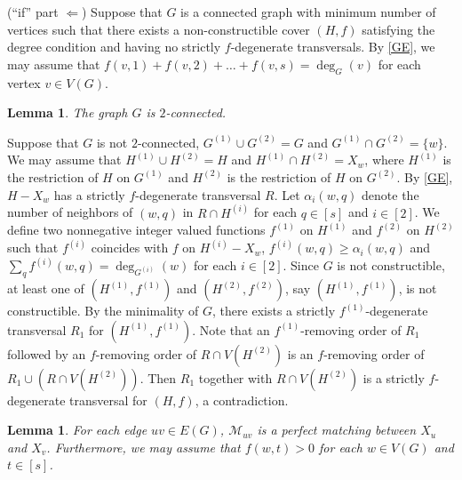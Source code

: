 \documentclass{article}
\makeatletter
\renewenvironment{proof}[1][\proofname]{\par
  \pushQED{\qed}%
  \normalfont \topsep6\p@\@plus6\p@\relax
  \trivlist
  \item[\hskip\labelsep
        \bfseries
    #1\@addpunct{.}]\ignorespaces
}{%
  \popQED\endtrivlist\@endpefalse
}
\newtheorem{lemma}[theorem]{Lemma}
\theoremstyle{definition}
\makeatother
\begin{document}
\begin{proof}[Proof of \autoref{MR}]
(``if'' part $\Longleftarrow$) Suppose that $G$ is a connected graph with minimum number of vertices such that there exists a non-constructible cover $(H, f)$ satisfying the degree condition and having no strictly $f$-degenerate transversals. By \autoref{GE}, we may assume that $f(v, 1) + f(v, 2) + \dots + f(v, s) = \deg_{G}(v)$ for each vertex $v \in V(G)$. 

\begin{lemma}\label{2-con}
The graph $G$ is $2$-connected. 
\end{lemma}
\begin{proof}
Suppose that $G$ is not $2$-connected, $G^{(1)} \cup G^{(2)} = G$ and $G^{(1)} \cap G^{(2)} = \{w\}$. We may assume that $H^{(1)} \cup H^{(2)} = H$ and $H^{(1)} \cap H^{(2)} = X_{w}$, where $H^{(1)}$ is the restriction of $H$ on $G^{(1)}$ and $H^{(2)}$ is the restriction of $H$ on $G^{(2)}$. By \autoref{GE}, $H - X_{w}$ has a strictly $f$-degenerate transversal $R$. Let $\alpha_{i}(w, q)$ denote the number of neighbors of $(w, q)$ in $R \cap H^{(i)}$ for each $q \in [s]$ and $i \in [2]$. We define two nonnegative integer valued functions $f^{(1)}$ on $H^{(1)}$ and $f^{(2)}$ on $H^{(2)}$ such that $f^{(i)}$ coincides with $f$ on $H^{(i)} - X_{w}$, $f^{(i)}(w, q) \geq \alpha_{i}(w, q)$ and $\sum_{q} f^{(i)}(w, q) = \deg_{G^{(i)}}(w)$ for each $i \in [2]$. Since $G$ is not constructible, at least one of $(H^{(1)}, f^{(1)})$ and $(H^{(2)}, f^{(2)})$, say $(H^{(1)}, f^{(1)})$, is not constructible. By the minimality of $G$, there exists a strictly $f^{(1)}$-degenerate transversal $R_{1}$ for $(H^{(1)}, f^{(1)})$. Note that an $f^{(1)}$-removing order of $R_{1}$ followed by an $f$-removing order of $R \cap V(H^{(2)})$ is an $f$-removing order of $R_{1} \cup (R \cap V(H^{(2)}))$. Then $R_{1}$ together with $R \cap V(H^{(2)})$ is a strictly $f$-degenerate transversal for $(H, f)$, a contradiction. 
\end{proof}
\begin{lemma}\label{NZ-PM}
For each edge $uv \in E(G)$, $\mathscr{M}_{uv}$ is a perfect matching between $X_{u}$ and $X_{v}$. Furthermore, we may assume that $f(w, t) > 0$ for each $w \in V(G)$ and $t \in [s]$. 
\end{lemma}
\begin{proof}

\end{proof}
\end{proof}
\end{document}
